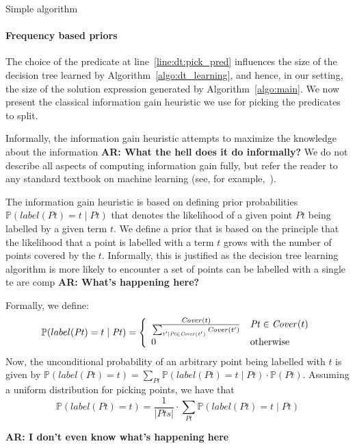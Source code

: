\documentclass{llncs}
\newcommand\arsays[1]{{\bf AR: #1}}
\newcommand\Points{\mathit{Pts}}
\newcommand\Point{\mathit{Pt}}
\newcommand\Term{t}
\newcommand\Cover{\mathit{Cover}}
\newcommand\Prob[1]{\mathbb{P}(#1)}
\begin{document}
\begin{example}
  Simple algorithm
\end{example}

\paragraph{Frequency based priors}
The choice of the predicate at line~\ref{line:dt:pick_pred} influences
the size of the decision tree learned by
Algorithm~\ref{algo:dt_learning}, and hence, in our setting, the size of
the solution expression generated by Algorithm~\ref{algo:main}.
We now present the classical information gain heuristic we use for
picking the predicates to split.

Informally, the information gain heuristic attempts to maximize the
knowledge about the information \arsays{What the hell does it do
informally?}
We do not describe all aspects of computing information gain fully, but
refer the reader to any standard textbook on machine learning (see, for
example,~\cite{xxx}).

The information gain heuristic is based on defining prior
probabilities $\Prob{label(\Point) = \Term \mid \Point}$ that denotes 
the likelihood of a given point $\Point$ being labelled by a given term
$\Term$.
We define a prior that is based on the principle that the likelihood
that a point is labelled with a term $\Term$ grows with the number of
points covered by the $\Term$.
Informally, this is justified as the decision tree learning algorithm is
more likely to encounter a set of points can be labelled with a single
te are comp \arsays{What's happening here?}

Formally, we define:
\[
    \Prob{label(\Point) = t \mid \Point} = \left\{
    \begin{array}{l l}
      \frac{\Cover(\Term)}{\sum_{\Term' | \Point \in \Cover(\Term')} \Cover(\Term') } & \Point \in \Cover(\Term) \\
        0  & \mbox{otherwise}
    \end{array} \right.
\]
Now, the unconditional probability of an arbitrary point being labelled
with $\Term$ is given by $\Prob{label(\Point) = \Term} = \sum_{\Point}
\Prob{label(\Point) = \Term \mid \Point}\cdot\Prob{\Point}$.
Assuming a uniform distribution for picking points, we have that
\[
    \Prob{label(\Point) = t} =  \frac{1}{\vert \Points \vert} \cdot \sum_{\Point} \Prob{label(\Point) = \Term \mid \Point}
\]

\arsays{I don't even know what's happening here}
\end{document}
